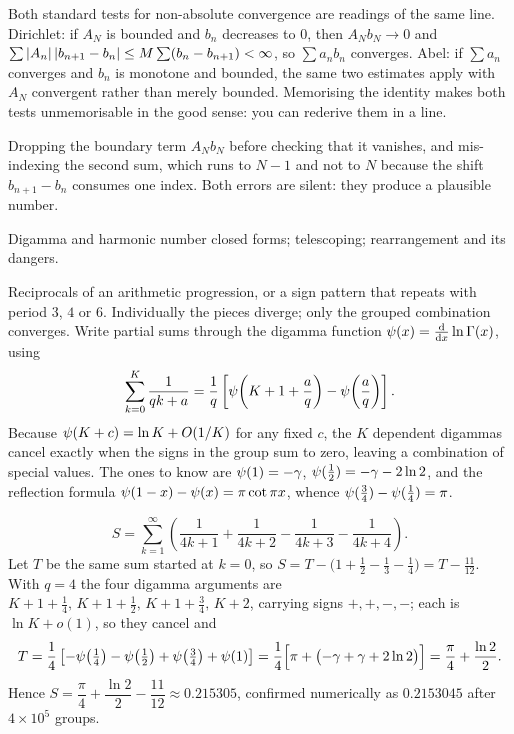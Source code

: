 \begin{keynote}
Both standard tests for non-absolute convergence are readings of the same line. Dirichlet: if $A_N$ is bounded and $b_n$ decreases to $0$, then $A_Nb_N\to0$ and $\sum\left\lvert A_n\right\rvert\left\lvert b_{n+1}-b_n\right\rvert\leq M\sum(b_n-b_{n+1})<\infty$, so $\sum a_nb_n$ converges. Abel: if $\sum a_n$ converges and $b_n$ is monotone and bounded, the same two estimates apply with $A_N$ convergent rather than merely bounded. Memorising the identity makes both tests unmemorisable in the good sense: you can rederive them in a line.
\end{keynote}

\begin{trap}
Dropping the boundary term $A_Nb_N$ before checking that it vanishes, and mis-indexing the second sum, which runs to $N-1$ and not to $N$ because the shift $b_{n+1}-b_n$ consumes one index. Both errors are silent: they produce a plausible number.
\end{trap}

\begin{seealsob}Digamma and harmonic number closed forms; telescoping; rearrangement and its dangers.\end{seealsob}

\cue Reciprocals of an arithmetic progression, or a sign pattern that repeats with period $3$, $4$ or $6$. Individually the pieces diverge; only the grouped combination converges.
\method Write partial sums through the digamma function $\psi(x)=\frac{\mathrm{d}}{\mathrm{d}x}\ln\Gamma(x)$, using
\[\sum_{k=0}^{K}\frac{1}{qk+a}=\frac{1}{q}\left[\psi\!\left(K+1+\frac{a}{q}\right)-\psi\!\left(\frac{a}{q}\right)\right].\]
Because $\psi(K+c)=\ln K+O(1/K)$ for any fixed $c$, the $K$ dependent digammas cancel exactly when the signs in the group sum to zero, leaving a combination of special values. The ones to know are $\psi(1)=-\gamma$, $\psi(\tfrac12)=-\gamma-2\ln2$, and the reflection formula $\psi(1-x)-\psi(x)=\pi\cot\pi x$, whence $\psi(\tfrac34)-\psi(\tfrac14)=\pi$.

\begin{worked}
\[S=\sum_{k=1}^{\infty}\left(\frac{1}{4k+1}+\frac{1}{4k+2}-\frac{1}{4k+3}-\frac{1}{4k+4}\right).\]
Let $T$ be the same sum started at $k=0$, so $S=T-\bigl(1+\tfrac12-\tfrac13-\tfrac14\bigr)=T-\tfrac{11}{12}$. With $q=4$ the four digamma arguments are $K+1+\tfrac14,\,K+1+\tfrac12,\,K+1+\tfrac34,\,K+2$, carrying signs $+,+,-,-$; each is $\ln K+o(1)$, so they cancel and
\[T=\frac14\left[-\psi\!\left(\tfrac14\right)-\psi\!\left(\tfrac12\right)+\psi\!\left(\tfrac34\right)+\psi(1)\right] =\frac14\Bigl[\pi+\bigl(-\gamma+\gamma+2\ln2\bigr)\Bigr]=\frac{\pi}{4}+\frac{\ln2}{2}.\]
Hence $S=\dfrac{\pi}{4}+\dfrac{\ln2}{2}-\dfrac{11}{12}\approx0.215305$, confirmed numerically as $0.2153045$ after $4\times10^{5}$ groups.
\end{worked}

